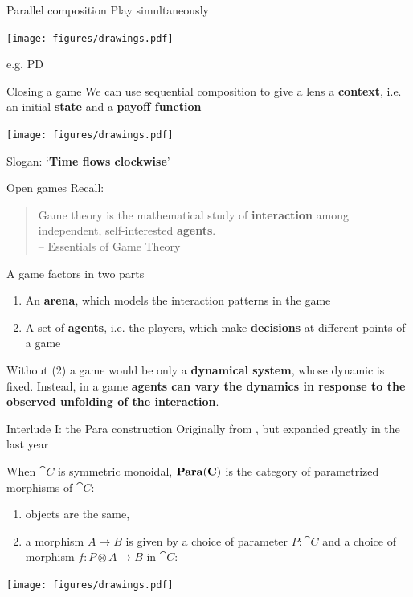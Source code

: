 \begin{frame}{Parallel composition}
	Play simultaneously
	\vfill
	\begin{center}
		\texttt{[image: figures/drawings.pdf]}
	\end{center}
	\vfill
	e.g. PD
\end{frame}

\begin{frame}{Closing a game}
	We can use sequential composition to give a lens a \textbf{context}, i.e. an initial \textbf{state} and a \textbf{payoff function}

	\begin{center}
		\texttt{[image: figures/drawings.pdf]}
	\end{center}

	Slogan: `\textbf{Time flows clockwise}'
\end{frame}

\begin{frame}{Open games}
	Recall:

	\vfill
	\begin{quotation}
		Game theory is the mathematical study of \textbf{interaction} among independent, self-interested \textbf{agents}.\\
		{\color{colornote}-- Essentials of Game Theory \cite{leyton2008essentials}}
	\end{quotation}

	\vfill
	A game factors in two parts
	\begin{enumerate}
		\item An \textbf{arena}, which models the {interaction patterns} in the game
		\item A set of \textbf{agents}, i.e. the players, which make \textbf{decisions} at different points of a game
	\end{enumerate}

	\vfill
	Without (2) a game would be only a \textbf{dynamical system}, whose dynamic is fixed.
	Instead, in a game \textbf{agents can vary the dynamics in response to the observed unfolding of the interaction}.
\end{frame}

\begin{frame}{Interlude I: the Para construction}
	Originally from \cite{fong2019backprop}, but expanded greatly in the last year

	\begin{definition}
		When $\cat C$ is symmetric monoidal, $\mathbf{Para}(\mathbf{C})$ is the category of parametrized morphisms of $\cat C$:
		\begin{enumerate}
			\item objects are the same,
			\item a morphism $A \to B$ is given by a choice of parameter $P : \cat C$ and a choice of morphism $f:P \otimes A \to B$ in $\cat C$:
		\end{enumerate}
	\end{definition}

	\begin{center}
		\texttt{[image: figures/drawings.pdf]}
	\end{center}
\end{frame}


